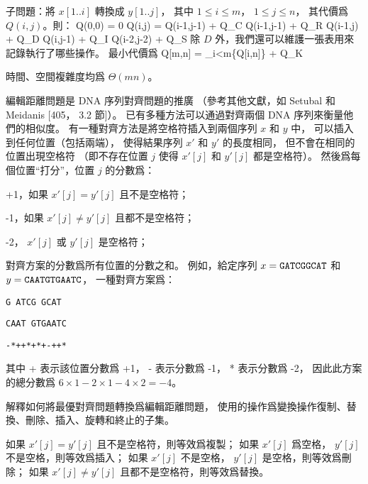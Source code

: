 \startANSWER
子問題：將 $x[1..i]$ 轉換成 $y[1..j]$，
其中 $1\le i\le m$， $1\le j\le n$，
其代價爲 $Q(i,j)$。則：
\startformula\startmathalignment
\NC Q(0,0) \NC = 0 \NR
\NC Q(i,j) \NC = \min\startcases
\NC Q(i-1,j-1) + Q_C \NC {} \NR
\NC Q(i-1,j-1) + Q_R \NC {} \NR
\NC Q(i-1,j) + Q_D \NC \NR
\NC Q(i,j-1) + Q_I \NC \NR
\NC Q(i-2,j-2) + Q_S \NC {} \NR
\stopcases \NR
\stopmathalignment\stopformula
除 $D$ 外，我們還可以維護一張表用來記錄執行了哪些操作。
最小代價爲
\startformula
Q[m,n] = \min_{i<m}\{Q[i,n]\} + Q_K
\stopformula

時間、空間複雜度均爲 $\Theta(mn)$。
\stopANSWER

編輯距離問題是 DNA 序列對齊問題的推廣
（參考其他文獻，如 Setubal 和 Meidanis [405， 3.2 節]）。
已有多種方法可以通過對齊兩個 DNA 序列來衡量他們的相似度。
有一種對齊方法是將空格符插入到兩個序列 $x$ 和 $y$ 中，
可以插入到任何位置（包括兩端），
使得結果序列 $x'$ 和 $y'$ 的長度相同，
但不會在相同的位置出現空格符
（即不存在位置 $j$ 使得 $x'[j]$ 和 $y'[j]$ 都是空格符）。
然後爲每個位置“打分”，位置 $j$ 的分數爲：

+1，如果 $x'[j]=y'[j]$ 且不是空格符；

-1，如果 $x'[j]\ne y'[j]$ 且都不是空格符；

-2， $x'[j]$ 或 $y'[j]$ 是空格符；

對齊方案的分數爲所有位置的分數之和。
例如，給定序列 $x=\text{\tt GATCGGCAT}$ 和 $y=\text{\tt CAATGTGAATC}$，
一種對齊方案爲：

{\tt G ATCG GCAT }

{\tt CAAT GTGAATC}

{\tt -*++*+*+-++*}

其中 + 表示該位置分數爲 +1， - 表示分數爲 -1， * 表示分數爲 -2，
因此此方案的總分數爲 $6\times 1 - 2 \times 1 - 4 \times 2 = -4$。

\startigBase[continue]\startitem
解釋如何將最優對齊問題轉換爲編輯距離問題，
使用的操作爲變換操作復制、替換、刪除、插入、旋轉和終止的子集。
\stopitem\stopigBase

\startANSWER
如果 $x'[j]=y'[j]$ 且不是空格符，則等效爲複製；
如果 $x'[j]$ 爲空格， $y'[j]$ 不是空格，則等效爲插入；
如果 $x'[j]$ 不是空格， $y'[j]$ 是空格，則等效爲刪除；
如果 $x'[j]\ne y'[j]$ 且都不是空格符，則等效爲替換。
\stopANSWER

\stopPROBLEM
